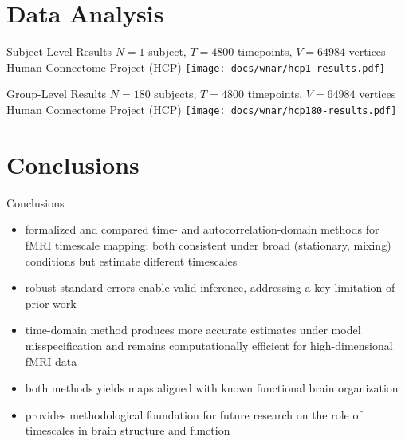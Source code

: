 \documentclass[8pt,aspectratio=169]{beamer}
\begin{document}
\section{Data Analysis}


\begin{frame}{Subject-Level Results}
$N = 1$ subject, \;$T = 4800$ timepoints,\; $V = 64984$ vertices \hfill Human Connectome Project (HCP)
\vfill
\centering
\texttt{[image: docs/wnar/hcp1-results.pdf]}
\end{frame}

\begin{frame}{Group-Level Results}
$N = 180$ subjects, \;$T = 4800$ timepoints,\; $V = 64984$ vertices \hfill  Human Connectome Project (HCP)
\vfill
\centering
\texttt{[image: docs/wnar/hcp180-results.pdf]}
\end{frame}

\section{Conclusions}

\begin{frame}{Conclusions}
\begin{itemize}
    \item formalized and compared time- and autocorrelation-domain methods for fMRI timescale mapping; both consistent under broad (stationary, mixing) conditions but estimate different timescales
    \item robust standard errors enable valid inference, addressing a key limitation of prior work
    \item time-domain method produces more accurate estimates under model misspecification and remains computationally efficient for high-dimensional fMRI data
    \item both methods yields maps aligned with known functional brain organization
    \item provides methodological foundation for future research on the role of timescales in brain structure and function
\end{itemize}
\end{frame}
\end{document}
